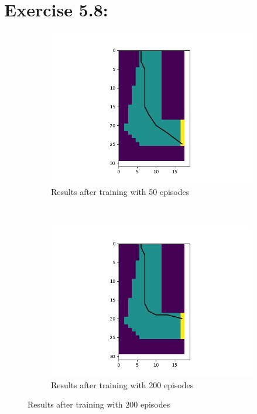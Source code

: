 \documentclass[10pt,letterpaper]{article}
\begin{document}
\section*{Exercise 5.8: }
\label{5.8}
\begin{figure}
   \centering
    \begin{subfigure}[b]{0.5\textwidth}
        \centering
        \includegraphics[scale=0.4]{RaceTrace_50}
        \caption{Results after training with 50 episodes}
    \end{subfigure}%
~
    \begin{subfigure}[b]{0.5\textwidth}
        \centering
        \includegraphics[scale=0.4]{RaceTrace_200}
        \caption{Results after training with 200 episodes}
    \end{subfigure}%


\end{figure}
\end{document}

